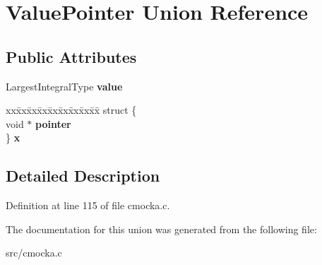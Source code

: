\hypertarget{unionValuePointer}{}\section{Value\+Pointer Union Reference}
\label{unionValuePointer}
\subsection*{Public Attributes}
\begin{DoxyCompactItemize}
\item 
\mbox{\label{unionValuePointer_ad8994d8ea772e4033e1017ecb7b7b251}} 
Largest\+Integral\+Type {\bfseries value}
\item 
\mbox{\label{unionValuePointer_a088c1a29a21d4bb2d6529c63fb08dff3}} 
\begin{tabbing}
xx\=xx\=xx\=xx\=xx\=xx\=xx\=xx\=xx\=\kill
struct \{\\
\>void $\ast$ {\bfseries pointer}\\
\} {\bfseries x}\\

\end{tabbing}\end{DoxyCompactItemize}


\subsection{Detailed Description}


Definition at line 115 of file cmocka.\+c.



The documentation for this union was generated from the following file\+:\begin{DoxyCompactItemize}
\item 
src/cmocka.\+c\end{DoxyCompactItemize}
